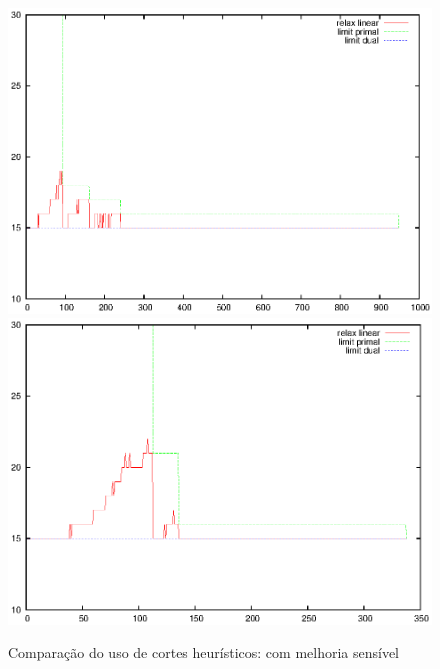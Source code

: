 \documentclass[11pt]{article}
\begin{document}
\begin{figure}[htb]
\centering
\includegraphics[scale=0.5]{kroB100_60-f00}%
\includegraphics[scale=0.5]{kroB100_60-f01}
\caption{Comparação do uso de cortes heurísticos: com melhoria sensível}
\label{fig:kroB100_60f}
\end{figure}




\end{document}
